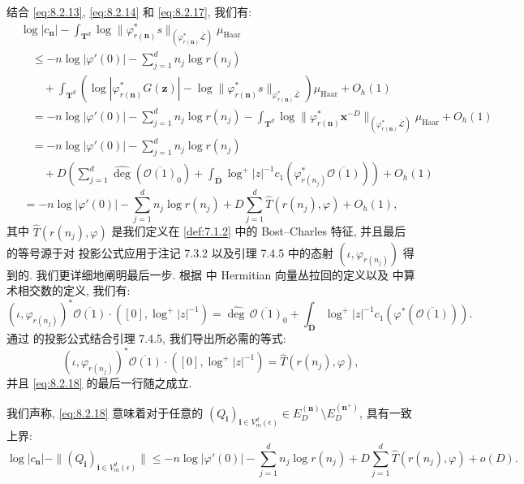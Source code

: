 结合 \eqref{eq:8.2.13}, \eqref{eq:8.2.14} 和 \eqref{eq:8.2.17}, 我们有:
\begin{equation}\label{eq:8.2.18}
\begin{aligned}
&\log |c_{\mathbf{n}}| - \int_{\mathbf{T}^{d}} \log \|\varphi_{r(\mathbf{n})}^{*}s\|_{(\varphi_{r(\mathbf{n})}^{*}\overline{\mathcal{L}})} \mu_{\mathrm{Haar}} \\
&\quad \leq -n \log |\varphi'(0)| - \sum_{j=1}^{d} n_{j} \log r(n_{j}) \\
&\qquad + \int_{\mathbf{T}^{d}} \left( \log |\varphi_{r(\mathbf{n})}^{*}G(\mathbf{z})| - \log \|\varphi_{r(\mathbf{n})}^{*}s\|_{\varphi_{r(\mathbf{n})}^{*}\overline{\mathcal{L}}} \right) \mu_{\mathrm{Haar}} + O_{h}(1) \\
&\quad = -n \log |\varphi'(0)| - \sum_{j=1}^{d} n_{j} \log r(n_{j}) - \int_{\mathbf{T}^{d}} \log \|\varphi_{r(\mathbf{n})}^{*}\mathbf{x}^{-D}\|_{(\varphi_{r(\mathbf{n})}^{*}\overline{\mathcal{L}})} \mu_{\mathrm{Haar}} + O_{h}(1) \\
&\quad = -n \log |\varphi'(0)| - \sum_{j=1}^{d} n_{j} \log r(n_{j}) \\
&\qquad + D \left( \sum_{j=1}^{d} \widehat{\deg}(\overline{\mathcal{O}(1)}_{0}) + \int_{\overline{\mathbf{D}}} \log^{+} |z|^{-1} c_{1}(\varphi_{r(n_{j})}^{*}\overline{\mathcal{O}(1)}) \right) + O_{h}(1)
\end{aligned}
\end{equation}
\[ = -n \log |\varphi'(0)| - \sum_{j=1}^{d} n_{j} \log r(n_{j}) + D \sum_{j=1}^{d} \widehat{T}(r(n_{j}), \varphi) + O_{h}(1), \]
其中 \(\widehat{T}(r(n_j), \varphi)\) 是我们定义在 \ref{def:7.1.2} 中的 Bost--Charles 特征, 
并且最后的等号源于对 \cite[命题 7.2.2]{BC22} 投影公式应用于注记 7.3.2 以及引理 7.4.5 中的态射 \((\iota, \varphi_{r(n_j)})\) 得到的. 
我们更详细地阐明最后一步. 
根据 \cite[第 7.1.1.1 节]{BC22} 中 Hermitian 向量丛拉回的定义以及 \cite[等式 6.2.4]{BC22} 中算术相交数的定义, 
我们有:
\[ (\iota, \varphi_{r(n_j)})^* \overline{\mathcal{O}(1)} \cdot ([0], \log^+|z|^{-1}) = \widehat{\operatorname{deg}} \, \overline{\mathcal{O}(1)}_0 + \int_{\overline{\mathbf{D}}} \log^+|z|^{-1} c_1(\varphi^*(\overline{\mathcal{O}(1)})). \]
通过 \cite[命题 7.2.2]{BC22} 的投影公式结合引理 7.4.5, 
我们导出所必需的等式:
\[ (\iota, \varphi_{r(n_j)})^* \overline{\mathcal{O}(1)} \cdot ([0], \log^+ |z|^{-1}) = \widehat{T}(r(n_j), \varphi), \]
并且 \eqref{eq:8.2.18} 的最后一行随之成立.

我们声称, \eqref{eq:8.2.18} 意味着对于任意的 \((Q_{\mathbf{i}})_{\mathbf{i} \in V_m^d(\epsilon)} \in E_D^{(\mathbf{n})} \setminus E_D^{(\mathbf{n}^+)}\), 
具有一致上界:
\begin{equation}\label{eq:8.2.19}
\log |c_{\mathbf{n}}| - \|(Q_{\mathbf{i}})_{\mathbf{i} \in V_m^d(\epsilon)}\| \le -n \log |\varphi'(0)| - \sum_{j=1}^d n_j \log r(n_j) + D \sum_{j=1}^d \widehat{T}(r(n_j), \varphi) + o(D).
\end{equation}

